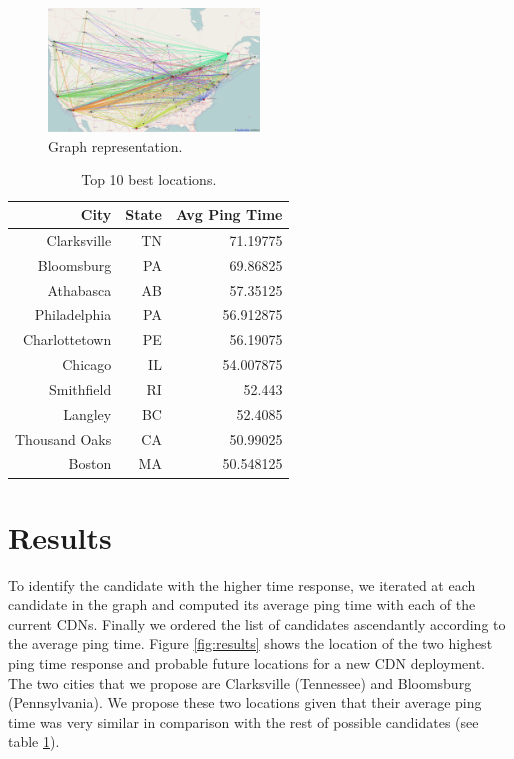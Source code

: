 \documentclass[11pt,twocolumn]{article}
\begin{document}
\begin{figure}
  \centering
  \includegraphics[width=0.5\textwidth]{vis.png}
  \caption{Graph representation.}\label{fig:vis}
\end{figure}

\begin{table}[h!]
 \centering
 \begin{center}
\begin{tabular}{rrr}
\toprule
City & State & Avg Ping Time \\
\midrule
Clarksville & TN & 71.19775 \\
Bloomsburg & PA & 69.86825 \\
Athabasca & AB & 57.35125 \\
Philadelphia & PA & 56.912875 \\
Charlottetown & PE & 56.19075 \\
Chicago & IL & 54.007875 \\
Smithfield & RI & 52.443 \\
Langley & BC & 52.4085 \\
Thousand Oaks & CA & 50.99025 \\
Boston & MA & 50.548125 \\
\bottomrule
 \end{tabular}
 \end{center}
 \caption{Top 10 best locations.}
 \label{tab:rank}
\end{table}

\section{Results}
To identify the candidate with the higher time response, we iterated at each candidate in the graph and computed its average ping time with each of the current CDNs. Finally we ordered the list of candidates ascendantly according to the average ping time.  Figure \ref{fig:results} shows the location of the two highest ping time response and probable future locations for a new CDN deployment.  The two cities that we propose are Clarksville (Tennessee) and Bloomsburg (Pennsylvania).  We propose these two locations given that their average ping time was very similar in comparison with the rest of possible candidates (see table \ref{tab:rank}).
\end{document}
